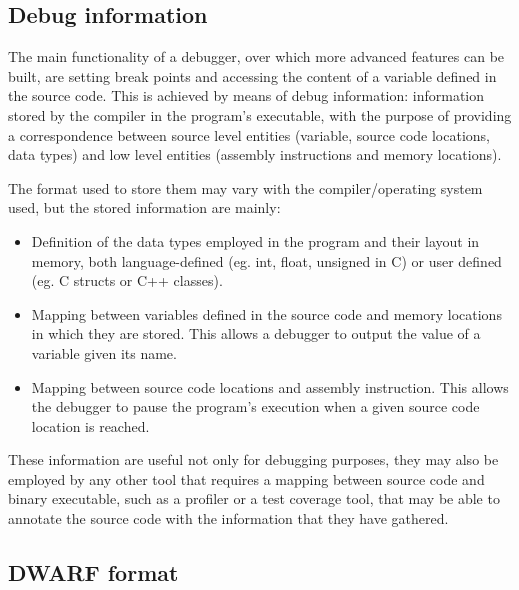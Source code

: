 \subsection{Debug information}
The main functionality of a debugger, over which more advanced features can be built, are setting break points and accessing the content of a variable defined in the source code. \newline 
This is achieved by means of debug information: information stored by the compiler in the program's executable, with the purpose of providing a correspondence between source level entities (variable, source code locations, data types) and low level entities (assembly instructions and memory locations). \par
The format used to store them may vary with the compiler/operating system used, but the stored information are mainly:
\begin{itemize}
\item Definition of the data types employed in the program and their layout in memory, both language-defined (eg. int, float, unsigned in C) or user defined (eg. C structs or C++ classes). 
\item Mapping between variables defined in the source code and memory locations in which they are stored. This allows a debugger to output the value of a variable given its name.
\item Mapping between source code locations and assembly instruction. This allows the debugger to pause the program's execution when a given source code location is reached.
\end{itemize}
These information are useful not only for debugging purposes, they may also be employed by any other tool that requires a mapping between source code and binary executable, such as a profiler or a test coverage tool, that may be able to annotate the source code with the information that they have gathered.

\subsection{DWARF format}

